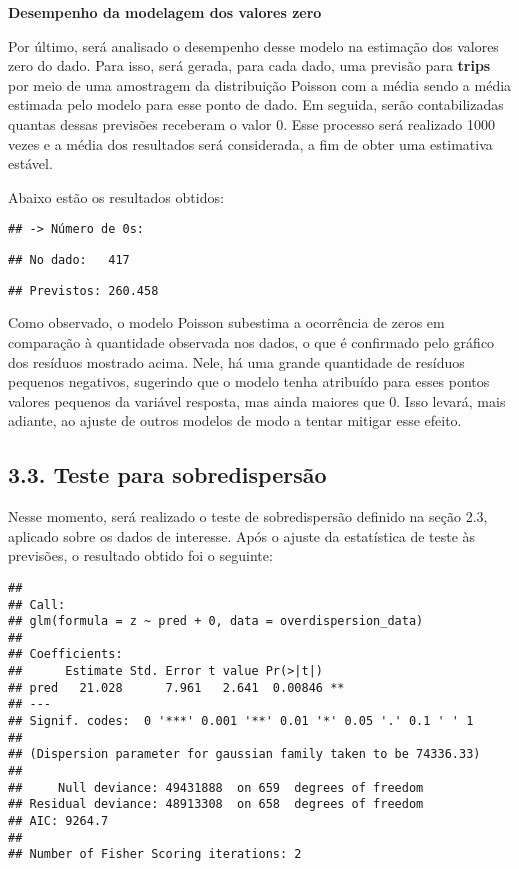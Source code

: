 \documentclass[
]{article}
\begin{document}
\textbf{Desempenho da modelagem dos valores zero}

Por último, será analisado o desempenho desse modelo na estimação dos
valores zero do dado. Para isso, será gerada, para cada dado, uma
previsão para \textbf{trips} por meio de uma amostragem da distribuição
Poisson com a média sendo a média estimada pelo modelo para esse ponto
de dado. Em seguida, serão contabilizadas quantas dessas previsões
receberam o valor 0. Esse processo será realizado 1000 vezes e a média
dos resultados será considerada, a fim de obter uma estimativa estável.

Abaixo estão os resultados obtidos:

\begin{verbatim}
## -> Número de 0s:
\end{verbatim}

\begin{verbatim}
## No dado:   417
\end{verbatim}

\begin{verbatim}
## Previstos: 260.458
\end{verbatim}

Como observado, o modelo Poisson subestima a ocorrência de zeros em
comparação à quantidade observada nos dados, o que é confirmado pelo
gráfico dos resíduos mostrado acima. Nele, há uma grande quantidade de
resíduos pequenos negativos, sugerindo que o modelo tenha atribuído para
esses pontos valores pequenos da variável resposta, mas ainda maiores
que 0. Isso levará, mais adiante, ao ajuste de outros modelos de modo a
tentar mitigar esse efeito.

\subsection{3.3. Teste para
sobredispersão}\label{teste-para-sobredispersuxe3o}

Nesse momento, será realizado o teste de sobredispersão definido na
seção 2.3, aplicado sobre os dados de interesse. Após o ajuste da
estatística de teste às previsões, o resultado obtido foi o seguinte:

\begin{verbatim}
## 
## Call:
## glm(formula = z ~ pred + 0, data = overdispersion_data)
## 
## Coefficients:
##      Estimate Std. Error t value Pr(>|t|)   
## pred   21.028      7.961   2.641  0.00846 **
## ---
## Signif. codes:  0 '***' 0.001 '**' 0.01 '*' 0.05 '.' 0.1 ' ' 1
## 
## (Dispersion parameter for gaussian family taken to be 74336.33)
## 
##     Null deviance: 49431888  on 659  degrees of freedom
## Residual deviance: 48913308  on 658  degrees of freedom
## AIC: 9264.7
## 
## Number of Fisher Scoring iterations: 2
\end{verbatim}
\end{document}
